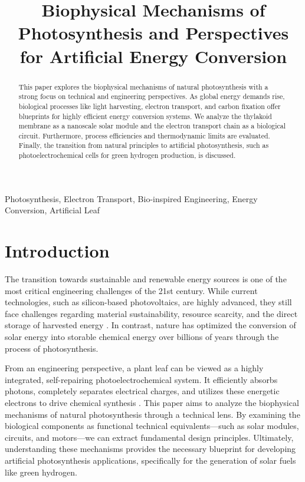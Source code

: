 \documentclass[conference]{IEEEtran}
\begin{document}
\title{Biophysical Mechanisms of Photosynthesis and Perspectives for Artificial Energy Conversion}

\author{
}

\maketitle

\begin{abstract}
This paper explores the biophysical mechanisms of natural photosynthesis with a strong focus on technical and engineering perspectives. As global energy demands rise, biological processes like light harvesting, electron transport, and carbon fixation offer blueprints for highly efficient energy conversion systems. We analyze the thylakoid membrane as a nanoscale solar module and the electron transport chain as a biological circuit. Furthermore, process efficiencies and thermodynamic limits are evaluated. Finally, the transition from natural principles to artificial photosynthesis, such as photoelectrochemical cells for green hydrogen production, is discussed.
\end{abstract}

\begin{IEEEkeywords}
Photosynthesis, Electron Transport, Bio-inspired Engineering, Energy Conversion, Artificial Leaf
\end{IEEEkeywords}

\section{Introduction}
The transition towards sustainable and renewable energy sources is one of the most critical engineering challenges of the 21st century. While current technologies, such as silicon-based photovoltaics, are highly advanced, they still face challenges regarding material sustainability, resource scarcity, and the direct storage of harvested energy \cite{PLATZHALTER_INTRO_1}. In contrast, nature has optimized the conversion of solar energy into storable chemical energy over billions of years through the process of photosynthesis. 

From an engineering perspective, a plant leaf can be viewed as a highly integrated, self-repairing photoelectrochemical system. It efficiently absorbs photons, completely separates electrical charges, and utilizes these energetic electrons to drive chemical synthesis \cite{PLATZHALTER_INTRO_2}. This paper aims to analyze the biophysical mechanisms of natural photosynthesis through a technical lens. By examining the biological components as functional technical equivalents—such as solar modules, circuits, and motors—we can extract fundamental design principles. Ultimately, understanding these mechanisms provides the necessary blueprint for developing artificial photosynthesis applications, specifically for the generation of solar fuels like green hydrogen.
\end{document}
